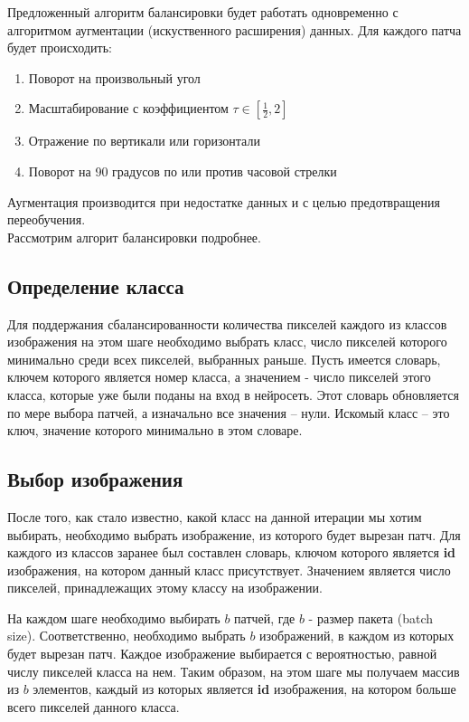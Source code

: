 \par Предложенный алгоритм балансировки будет работать одновременно с алгоритмом аугментации (искуственного расширения) данных. Для каждого патча будет происходить:
\begin{enumerate}[nosep]
    \item Поворот на произвольный угол
    \item Масштабирование с коэффициентом $\tau \in [\frac{1}{2}, 2]$
    \item Отражение по вертикали или горизонтали
    \item Поворот на 90 градусов по или против часовой стрелки
\end{enumerate}
Аугментация производится при недостатке данных и с целью предотвращения переобучения. \\
Рассмотрим алгорит балансировки подробнее.
\subsection{Определение класса}
Для поддержания сбалансированности количества пикселей каждого из классов изображения на этом шаге необходимо выбрать класс, число пикселей которого минимально среди всех пикселей, выбранных раньше.
Пусть имеется словарь, ключем которого является номер класса, а значением - число пикселей этого класса, которые уже были поданы на вход в нейросеть. Этот словарь обновляется по мере выбора патчей, а изначально все значения -- нули. Искомый класс -- это ключ, значение которого минимально в этом словаре.
\subsection{Выбор изображения}
После того, как стало известно, какой класс на данной итерации мы хотим выбирать, необходимо выбрать изображение, из которого будет вырезан патч. Для каждого из классов заранее был составлен словарь, ключом которого является \textbf{id} изображения, на котором данный класс присутствует. Значением является число пикселей, принадлежащих этому классу на изображении. 
\par
На каждом шаге необходимо выбирать $b$ патчей, где $b$ - размер пакета (batch size). Соответственно, необходимо выбрать $b$ изображений, в каждом из которых будет вырезан патч. Каждое изображение выбирается с вероятностью, равной числу пикселей класса на нем. Таким образом, на этом шаге мы получаем массив из $b$ элементов, каждый из которых является \textbf{id} изображения, на котором больше всего пикселей данного класса.
